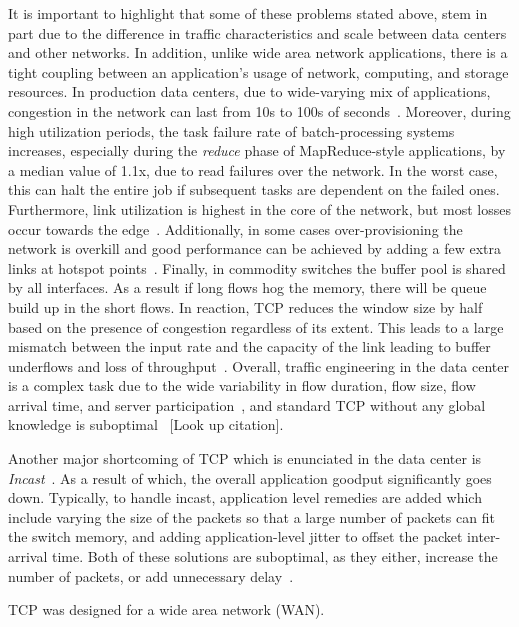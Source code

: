 \documentclass[a4paper,12pt,twoside,openright]{report}
\begin{document}
It is important to highlight that some of these problems stated above, stem in
part due to the difference in traffic characteristics and scale between data
centers and other networks. In addition, unlike wide area network applications,
there is a tight coupling between an application's usage of network, computing,
and storage resources. In production data centers, due to wide-varying mix of
applications, congestion in the network can last from 10s to 100s of
seconds~\cite{Kandula:2009:NDC}. Moreover, during high utilization periods, the
task failure rate of batch-processing systems increases, especially during the
\emph{reduce} phase of MapReduce-style applications, by a median value of 1.1x,
due to read failures over the network. In the worst case, this can halt the
entire job if subsequent tasks are dependent on the failed ones. Furthermore,
link utilization is highest in the core of the network, but most losses occur
towards the edge~\cite{Benson:2010:NTC}. Additionally, in some cases
over-provisioning the network is overkill and good performance can be achieved
by adding a few extra links at hotspot points~\cite{Kandula:2009:FTD}. Finally,
in commodity switches the buffer pool is shared by all interfaces. As a result
if long flows hog the memory, there will be queue build up in the short flows.
In reaction, TCP reduces the window size by half based on the presence of
congestion regardless of its extent. This leads to a large mismatch between the
input rate and the capacity of the link leading to buffer underflows and loss of
throughput~\cite{Alizadeh:2010:DCT}. Overall, traffic engineering in the data
center is a complex task due to the wide variability in flow duration, flow
size, flow arrival time, and server participation~\cite{Kandula:2009:NDC}, and
standard TCP without any global knowledge is suboptimal~\cite{Benson:2010:NTC}
[Look up citation].

Another major shortcoming of TCP which is enunciated in the data center is
\emph{Incast}~\cite{Chen:2009:UTI,Vasudevan:2009:SEF,Wu:2010:IIC,Alizadeh:2010:DCT}.
As a result of which, the overall application goodput significantly goes down.
Typically, to handle incast, application level remedies are added which include
varying the size of the packets so that a large number of packets can fit the
switch memory, and adding application-level jitter to offset the packet
inter-arrival time. Both of these solutions are suboptimal, as they either,
increase the number of packets, or add unnecessary
delay~\cite{Alizadeh:2010:DCT}.

TCP was designed for a wide area network (WAN).
\end{document}
